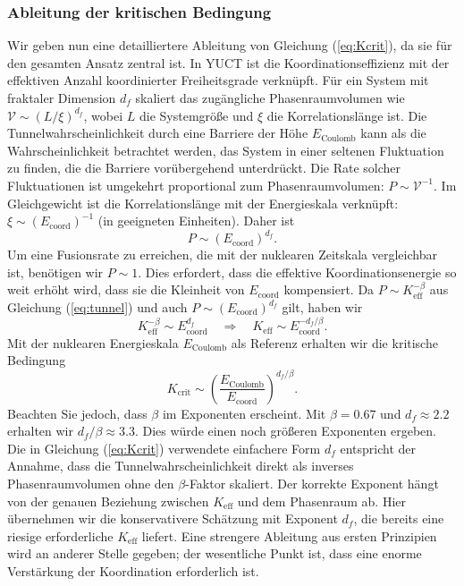 \documentclass[12pt]{article}
\theoremstyle{remark}
\newcommand{\Keff}{K_{\mathrm{eff}}}
\newcommand{\df}{d_{\!f}}
\newcommand{\Kcrit}{K_{\mathrm{crit}}}
\begin{document}
	\subsubsection{Ableitung der kritischen Bedingung}
	
	Wir geben nun eine detailliertere Ableitung von Gleichung (\ref{eq:Kcrit}), da sie für den gesamten Ansatz zentral ist. In YUCT ist die Koordinationseffizienz mit der effektiven Anzahl koordinierter Freiheitsgrade verknüpft. Für ein System mit fraktaler Dimension \(\df\) skaliert das zugängliche Phasenraumvolumen wie \(\mathcal{V} \sim (L/\xi)^{\df}\), wobei \(L\) die Systemgröße und \(\xi\) die Korrelationslänge ist. Die Tunnelwahrscheinlichkeit durch eine Barriere der Höhe \(E_{\text{Coulomb}}\) kann als die Wahrscheinlichkeit betrachtet werden, das System in einer seltenen Fluktuation zu finden, die die Barriere vorübergehend unterdrückt. Die Rate solcher Fluktuationen ist umgekehrt proportional zum Phasenraumvolumen: \(P \sim \mathcal{V}^{-1}\). Im Gleichgewicht ist die Korrelationslänge mit der Energieskala verknüpft: \(\xi \sim (E_{\mathrm{coord}})^{-1}\) (in geeigneten Einheiten). Daher ist
	\[
	P \sim (E_{\mathrm{coord}})^{\df}.
	\]
	Um eine Fusionsrate zu erreichen, die mit der nuklearen Zeitskala vergleichbar ist, benötigen wir \(P \sim 1\). Dies erfordert, dass die effektive Koordinationsenergie so weit erhöht wird, dass sie die Kleinheit von \(E_{\mathrm{coord}}\) kompensiert. Da \(P \sim \Keff^{-\beta}\) aus Gleichung (\ref{eq:tunnel}) und auch \(P \sim (E_{\mathrm{coord}})^{\df}\) gilt, haben wir
	\[
	\Keff^{-\beta} \sim E_{\mathrm{coord}}^{\df} \quad\Longrightarrow\quad \Keff \sim E_{\mathrm{coord}}^{-\df/\beta}.
	\]
	Mit der nuklearen Energieskala \(E_{\text{Coulomb}}\) als Referenz erhalten wir die kritische Bedingung
	\[
	\Kcrit \sim \left( \frac{E_{\text{Coulomb}}}{E_{\mathrm{coord}}} \right)^{\df/\beta}.
	\]
	Beachten Sie jedoch, dass \(\beta\) im Exponenten erscheint. Mit \(\beta = 0.67\) und \(\df \approx 2.2\) erhalten wir \(\df/\beta \approx 3.3\). Dies würde einen noch größeren Exponenten ergeben. Die in Gleichung (\ref{eq:Kcrit}) verwendete einfachere Form \(\df\) entspricht der Annahme, dass die Tunnelwahrscheinlichkeit direkt als inverses Phasenraumvolumen ohne den \(\beta\)-Faktor skaliert. Der korrekte Exponent hängt von der genauen Beziehung zwischen \(\Keff\) und dem Phasenraum ab. Hier übernehmen wir die konservativere Schätzung mit Exponent \(\df\), die bereits eine riesige erforderliche \(\Keff\) liefert. Eine strengere Ableitung aus ersten Prinzipien wird an anderer Stelle gegeben; der wesentliche Punkt ist, dass eine enorme Verstärkung der Koordination erforderlich ist.
	
\end{document}
